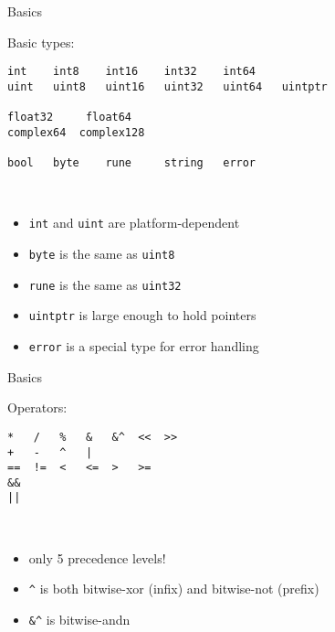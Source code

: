 \documentclass[10pt]{beamer}
\begin{document}

	\begin{frame}[fragile]{Basics}
		\begin{center}
			Basic types:
		\end{center}
		\begin{verbatim}
int    int8    int16    int32    int64
uint   uint8   uint16   uint32   uint64   uintptr

float32     float64
complex64  complex128

bool   byte    rune     string   error
		\end{verbatim}
		\\
		\begin{itemize}
			\item \texttt{int} and \texttt{uint} are platform-dependent
			\item \texttt{byte} is the same as \texttt{uint8}
			\item \texttt{rune} is the same as \texttt{uint32}
			\item \texttt{uintptr} is large enough to hold pointers
			\item \texttt{error} is a special type for error handling
		\end{itemize}
\end{frame}
	
	
	\begin{frame}[fragile]{Basics}
		\begin{center}
			Operators:
		\end{center}
		\begin{verbatim}
*   /   %   &   &^  <<  >>
+   -   ^   |
==  !=  <   <=  >   >=
&&
||
		\end{verbatim}
		\\
		\begin{itemize}
			\item only 5 precedence levels!
			\item \texttt{^} is both bitwise-xor (infix) and bitwise-not (prefix)
			\item \texttt{&^} is bitwise-andn
		\end{itemize}
\end{frame}
	
	
	\begin{frame}[fragile]{}
	\end{frame}
\end{document}
